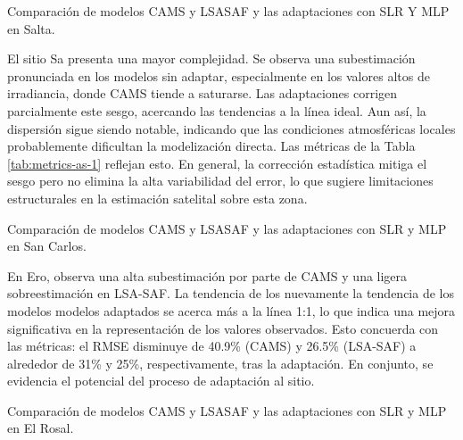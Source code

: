 \documentclass[letterpaper,12pt, twoside]{report}
\providecommand{\DIFdeltex}[1]{{\protect\color{red} \scriptsize #1}} %
\providecommand{\DIFdelFL}[1]{\DIFdel{#1}} %
\providecommand{\DIFdel}[1]{\texorpdfstring{\DIFdeltex{#1}}{}} %
\begin{document}
{%
\DIFdelFL{Comparación de modelos CAMS y LSASAF y las adaptaciones con SLR Y MLP en Salta.}}

\DIFdel{El sitio Sa presenta una mayor complejidad. Se observa una subestimación pronunciada en los modelos sin adaptar, especialmente en los valores altos de irradiancia, donde CAMS tiende a saturarse. Las adaptaciones corrigen parcialmente este sesgo, acercando las tendencias a la línea ideal. Aun así, la dispersión sigue siendo notable, indicando que las condiciones atmosféricas locales probablemente dificultan la modelización directa. Las métricas de la Tabla \ref{tab:metrics-as-1} reflejan esto. En general, la corrección estadística mitiga el sesgo pero no elimina la alta variabilidad del error, lo que sugiere limitaciones estructurales en la estimación satelital sobre esta zona.
}%

{%
\DIFdelFL{Comparación de modelos CAMS y LSASAF y las adaptaciones con SLR y MLP en San Carlos.}}

\DIFdel{En Ero, observa una alta subestimación por parte de CAMS y una ligera sobreestimación en LSA-SAF. La tendencia de los nuevamente la tendencia de los modelos modelos adaptados se acerca más a la línea 1:1, lo que indica una mejora significativa en la representación de los valores observados. Esto concuerda con las métricas: el RMSE disminuye de 40.9\% (CAMS) y 26.5\% (LSA-SAF) a alrededor de 31\% y 25\%, respectivamente, tras la adaptación. En conjunto, se evidencia el potencial del proceso de adaptación al sitio.
}%

{%
\DIFdelFL{Comparación de modelos CAMS y LSASAF y las adaptaciones con SLR y MLP en El Rosal.}}	
\end{document}

